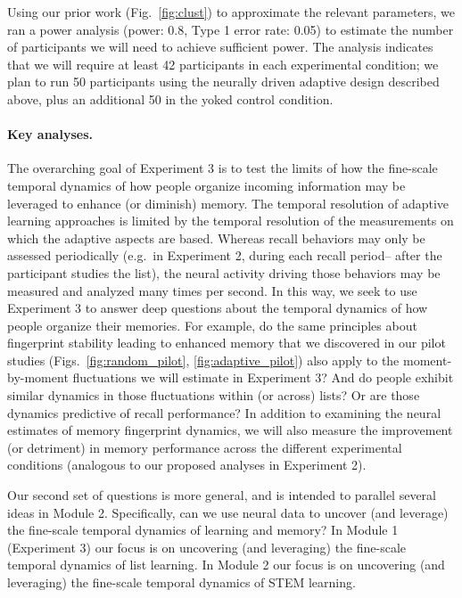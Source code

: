 Using our prior work (Fig.~\ref{fig:clust}) to approximate the relevant
parameters, we ran a power analysis (power: 0.8, Type 1 error rate: 0.05) to
estimate the number of participants we will need to achieve sufficient power.
The analysis indicates that we will require at least 42 participants in each
experimental condition; we plan to run 50 participants using the neurally
driven adaptive design described above, plus an additional 50 in the yoked
control condition.

\paragraph{Key analyses.} The overarching goal of Experiment 3 is to test the
limits of how the fine-scale temporal dynamics of how people organize incoming
information may be leveraged to enhance (or diminish) memory. The temporal
resolution of adaptive learning approaches is limited by the temporal
resolution of the measurements on which the adaptive aspects are based. Whereas
recall behaviors may only be assessed periodically (e.g.\ in Experiment 2,
during each recall period-- after the participant studies the list), the neural
activity driving those behaviors may be measured and analyzed many times per
second. In this way, we seek to use Experiment 3 to answer deep questions about
the temporal dynamics of how people organize their memories. For example, do
the same principles about fingerprint stability leading to enhanced memory that
we discovered in our pilot studies (Figs.~\ref{fig:random_pilot},
\ref{fig:adaptive_pilot}) also apply to the moment-by-moment fluctuations we
will estimate in Experiment 3? And do people exhibit similar dynamics in those
fluctuations within (or across) lists? Or are those dynamics predictive of
recall performance? In addition to examining the neural estimates of memory
fingerprint dynamics, we will also measure the improvement (or detriment) in
memory performance across the different experimental conditions (analogous to
our proposed analyses in Experiment 2).

Our second set of questions is more general, and is intended to parallel
several ideas in Module 2. Specifically, can we use neural data to uncover (and
leverage) the fine-scale temporal dynamics of learning and memory? In Module 1
(Experiment 3) our focus is on uncovering (and leveraging) the fine-scale
temporal dynamics of list learning. In Module 2 our focus is on uncovering (and
leveraging) the fine-scale temporal dynamics of STEM learning.
